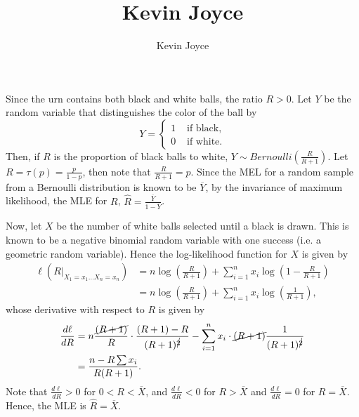 \documentclass{stat_homework}
\title{Kevin Joyce}
\author{Kevin Joyce}
\begin{document}
 
\renewcommand{\bar}{\overline}
\renewcommand{\hat}{\widehat}
\renewcommand{\SS}{\mathcal S}
\newcommand{\eps}{\varepsilon}
\newcommand{\todist}{\stackrel{D}\longrightarrow}
\newcommand{\toprob}{\stackrel{p}\longrightarrow}
\newcommand{\TTheta}{\overline{\underline \Theta} }

\begin{solution}
  Since the urn contains both black and white balls, the ratio $R>0$.
  Let $Y$ be the random variable that distinguishes the color of the ball by 
  $$
    Y = \begin{cases}
      1 &\text{ if black,}\\
      0 &\text{ if white.}
    \end{cases}
  $$
  Then, if $R$ is the proportion of black balls to white, $Y\sim Bernoulli\left(\frac{R}{R+1}\right)$.  Let $R = \tau(p) = \frac{p}{1-p}$, then note that $\frac{R}{R+1} = p$.  Since the MEL for a random sample from a Bernoulli distribution is known to be $\bar Y$, by the invariance of maximum likelihood, the MLE for $R$, $\hat R = \frac{\bar Y}{1 - \bar Y}$.

Now, let $X$ be the number of white balls selected until a black is drawn.  This is known to be a negative binomial random variable with one success (i.e. a geometric random variable).  Hence the log-likelihood function for $X$ is given by
\begin{align*}
  \ell(R |_{X_1=x_1\dots X_n=x_n}) &= n\log \left(\frac{R}{R+1}\right) + \sum_{i=1}^n x_i \log\left(1 - \frac{R}{R+1}\right) \\
  &= n \log \left(\frac{R}{R+1}\right) + \sum_{i=1}^n x_i  \log\left(\frac{1}{R+1}\right),
\end{align*}
whose derivative with respect to $R$ is given by
\begin{align*}
  \frac{d\ell}{dR} &= n\frac{\cancel{(R+1)}}{R}\cdot \frac{(R+1) - R}{(R+1)^{\cancel2}} - \sum_{i=1}^n x_i\cdot \cancel{(R+1)}\frac{1}{(R+1)^{\cancel2}}\\
		   &= \frac{n-R\sum x_i }{R(R+1)}.
\end{align*}
Note that $\frac{d\ell}{dR} > 0$ for $0<R<\bar X$, and $\frac{d\ell}{dR} < 0$ for $R > \bar X$ and $\frac{d\ell}{dR}=0$ for $R = \bar X$.  Hence, the MLE is $\hat R = \bar X$. 
\end{solution}
\newpage
\end{document}
